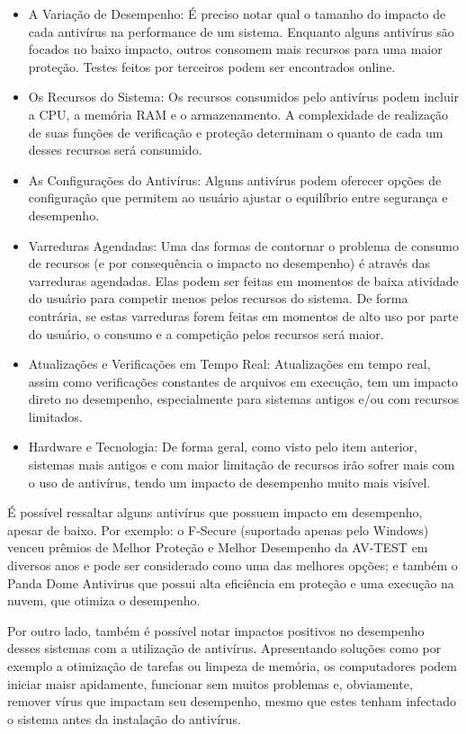 \documentclass[10pt,conference,twocolumn]{article}
\begin{document}
\begin{itemize}
\item
A Variação de Desempenho:
É preciso notar qual o tamanho do impacto de cada antivírus na performance de um sistema. Enquanto alguns antivírus são focados no baixo impacto, outros consomem mais recursos para uma maior proteção. Testes feitos por terceiros podem ser encontrados online.
\item
Os Recursos do Sistema:
Os recursos consumidos pelo antivírus podem incluir a CPU, a memória RAM e o armazenamento. A complexidade de realização de suas funções de verificação e proteção determinam o quanto de cada um desses recursos será consumido.
\item
As Configurações do Antivírus:
Alguns antivírus podem oferecer opções de configuração que permitem ao usuário ajustar o equilíbrio entre segurança e desempenho.
\item
Varreduras Agendadas:
Uma das formas de contornar o problema de consumo de recursos (e por consequência o impacto no desempenho) é através das varreduras agendadas. Elas podem ser feitas em momentos de baixa atividade do usuário para competir menos pelos recursos do sistema. De forma contrária, se estas varreduras forem feitas em momentos de alto uso por parte do usuário, o consumo e a competição pelos recursos será maior.
\item
Atualizações e Verificações em Tempo Real:
Atualizações em tempo real, assim como verificações constantes de arquivos em execução, tem um impacto direto no desempenho, especialmente para sistemas antigos e/ou com recursos limitados.
\item
Hardware e Tecnologia:
De forma geral, como visto pelo item anterior, sistemas mais antigos e com maior limitação de recursos irão sofrer mais com o uso de antivírus, tendo um impacto de desempenho muito mais visível.
\end{itemize}

É possível ressaltar alguns antivírus que possuem impacto em desempenho, apesar de baixo. Por exemplo: o F-Secure (suportado apenas pelo Windows) venceu prêmios de Melhor Proteção e Melhor Desempenho da AV-TEST em diversos anos e pode ser considerado como uma das melhores opções; e também o Panda Dome Antivirus que possui alta eficiência em proteção e uma execução na nuvem, que otimiza o desempenho.

Por outro lado, também é possível notar impactos positivos no desempenho desses sistemas com a utilização de antivírus. Apresentando soluções como por exemplo a otimização de tarefas ou limpeza de memória, os computadores podem iniciar maisr apidamente, funcionar sem muitos problemas e, obviamente, remover vírus que impactam seu desempenho, mesmo que estes tenham infectado o sistema antes da instalação do antivírus.
\end{document}

